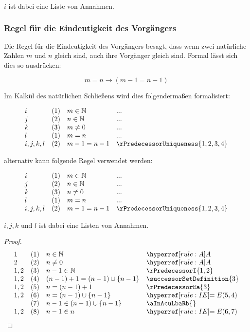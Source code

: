 \documentclass[main.tex]{subfiles}
\begin{document}
\(i\) ist dabei eine Liste von Annahmen.

\subsubsection{Regel für die Eindeutigkeit des Vorgängers}
\label{rule:rPredecessorUniqueness}

Die Regel für die Eindeutigkeit des Vorgängers besagt, dass wenn zwei natürliche Zahlen \(m\) und \(n\) gleich sind, auch ihre Vorgänger gleich sind. Formal lässt sich dies so ausdrücken:

\[
m = n \rightarrow (m-1 = n-1)
\]

Im Kalkül des natürlichen Schließens wird dies folgendermaßen formalisiert:

\[
\begin{array}{llll}
i & (1) & m\in\mathbb{N} & ... \\
j & (2) & n\in\mathbb{N} & ... \\
k & (3) & m\neq 0 & ... \\
l & (1) & m = n & ... \\
i,j,k,l & (2) & m - 1 = n - 1 & \rPredecessorUniqueness{1,2,3,4}
\end{array}
\]

alternativ kann folgende Regel verwendet werden:

\[
\begin{array}{llll}
i & (1) & m\in\mathbb{N} & ... \\
j & (2) & n\in\mathbb{N} & ... \\
k & (3) & n\neq 0 & ... \\
l & (1) & m = n & ... \\
i,j,k,l & (2) & m - 1 = n - 1 & \rPredecessorUniqueness{1,2,3,4}
\end{array}
\]

\(i,j,k\) und \(l\) ist dabei eine Listen von Annahmen.

\label{nInNaturalwnNotEqualsZeroImpnMinusOneInn}
\begin{theorem}
\end{theorem}
\begin{proof}
	\[
	\begin{array}{llll}
		1 & (1) & n\in\mathbb{N} & \rA \\
  		2 & (2) & n\neq 0 & \rA \\
  		1,2 & (3) & n-1\in\mathbb{N} & \rPredecessorI{1,2} \\
            1,2 & (4) & (n-1)+1 = (n-1)\cup \{n-1\} & \successorSetDefinition{3} \\
            1,2 & (5) & n = (n-1)+1 & \rPredecessorEa{3} \\
            1,2 & (6) & n = (n-1)\cup \{n-1\} & \rIE{5,4} \\
                & (7) & n-1\in (n-1)\cup \{n-1\} & \aInAcuLbaRb{} \\
            1,2 & (8) & n-1\in n & \rIE{6,7} \\
	\end{array}
	\]
\end{proof}
\end{document}
